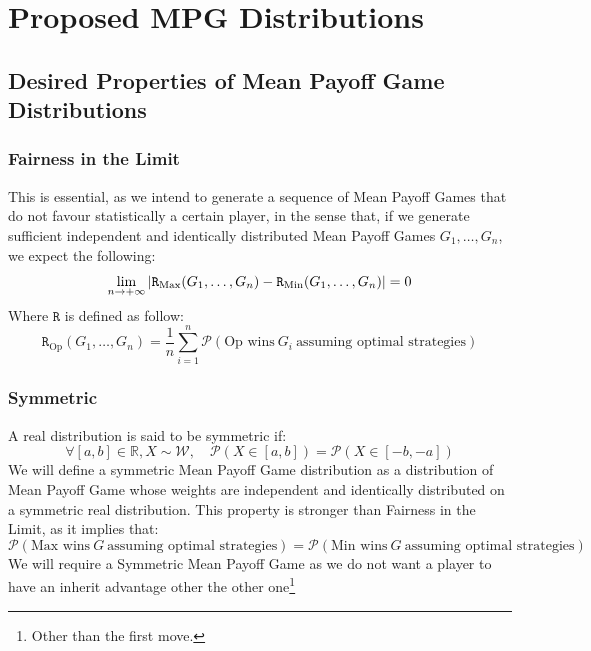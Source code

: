\section{Proposed MPG Distributions}
\subsection{Desired Properties of Mean Payoff Game Distributions}
\subsubsection{Fairness in the Limit}
This is essential, as we intend to generate a sequence of Mean Payoff Games that do not favour statistically a certain player, in the sense that, if we generate sufficient independent and identically distributed Mean Payoff Games $G_1,\dots,G_n$, we expect the following:
$$
\lim_{n\rightarrow +\infty} \left\lvert \mathtt{R}_{\operatorname{Max}}(G_1,\dots,G_n)-\mathtt{R}_{\operatorname{Min}}(G_1,\dots,G_n)\right \rvert = 0
$$
Where $\mathtt{R}$ is defined as follow:
$$
\mathtt{R}_{\text{Op}}(G_1,\dots,G_n)=\frac{1}{n}\sum_{i=1}^n\mathscr{P}(\text{Op wins} \ G_i\ \text{assuming optimal strategies})
$$
\subsubsection{Symmetric}
A real distribution is said to be symmetric if:
$$
\forall [a,b]\in \mathbb{R},X\sim \mathcal{W},\quad \mathscr{P}(X\in [a,b]) = \mathscr{P}(X\in [-b,-a])
$$
We will define a symmetric Mean Payoff Game distribution as a distribution of Mean Payoff Game whose weights are independent and identically distributed on a symmetric real distribution.
This property is stronger than Fairness in the Limit, as it implies that:
$$
\mathscr{P}(\text{Max wins} \ G\ \text{assuming optimal strategies}) = \mathscr{P}(\text{Min wins} \ G\ \text{assuming optimal strategies})
$$
We will require a Symmetric Mean Payoff Game as we do not want a player to have an inherit advantage other the other one\footnote{Other than the first move.}
